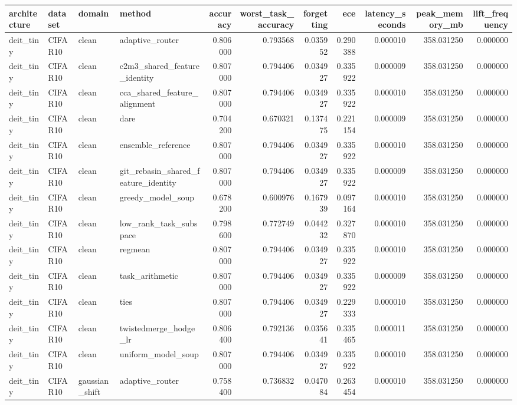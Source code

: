 \begin{tabular}{llllrrrrrrr}
\toprule
architecture & dataset & domain & method & accuracy & worst_task_accuracy & forgetting & ece & latency_seconds & peak_memory_mb & lift_frequency \\
\midrule
deit_tiny & CIFAR10 & clean & adaptive_router & 0.806000 & 0.793568 & 0.035952 & 0.290388 & 0.000010 & 358.031250 & 0.000000 \\
deit_tiny & CIFAR10 & clean & c2m3_shared_feature_identity & 0.807000 & 0.794406 & 0.034927 & 0.335922 & 0.000009 & 358.031250 & 0.000000 \\
deit_tiny & CIFAR10 & clean & cca_shared_feature_alignment & 0.807000 & 0.794406 & 0.034927 & 0.335922 & 0.000010 & 358.031250 & 0.000000 \\
deit_tiny & CIFAR10 & clean & dare & 0.704200 & 0.670321 & 0.137475 & 0.221154 & 0.000009 & 358.031250 & 0.000000 \\
deit_tiny & CIFAR10 & clean & ensemble_reference & 0.807000 & 0.794406 & 0.034927 & 0.335922 & 0.000010 & 358.031250 & 0.000000 \\
deit_tiny & CIFAR10 & clean & git_rebasin_shared_feature_identity & 0.807000 & 0.794406 & 0.034927 & 0.335922 & 0.000009 & 358.031250 & 0.000000 \\
deit_tiny & CIFAR10 & clean & greedy_model_soup & 0.678200 & 0.600976 & 0.167939 & 0.097164 & 0.000010 & 358.031250 & 0.000000 \\
deit_tiny & CIFAR10 & clean & low_rank_task_subspace & 0.798600 & 0.772749 & 0.044232 & 0.327870 & 0.000010 & 358.031250 & 0.000000 \\
deit_tiny & CIFAR10 & clean & regmean & 0.807000 & 0.794406 & 0.034927 & 0.335922 & 0.000010 & 358.031250 & 0.000000 \\
deit_tiny & CIFAR10 & clean & task_arithmetic & 0.807000 & 0.794406 & 0.034927 & 0.335922 & 0.000009 & 358.031250 & 0.000000 \\
deit_tiny & CIFAR10 & clean & ties & 0.807000 & 0.794406 & 0.034927 & 0.229333 & 0.000010 & 358.031250 & 0.000000 \\
deit_tiny & CIFAR10 & clean & twistedmerge_hodge_lr & 0.806400 & 0.792136 & 0.035641 & 0.335465 & 0.000011 & 358.031250 & 0.000000 \\
deit_tiny & CIFAR10 & clean & uniform_model_soup & 0.807000 & 0.794406 & 0.034927 & 0.335922 & 0.000010 & 358.031250 & 0.000000 \\
deit_tiny & CIFAR10 & gaussian_shift & adaptive_router & 0.758400 & 0.736832 & 0.047084 & 0.263454 & 0.000010 & 358.031250 & 0.000000 \\

\end{tabular}
